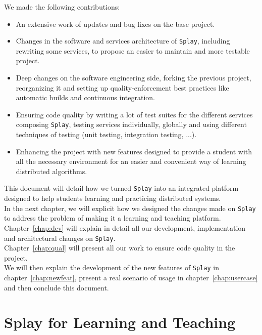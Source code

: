 \documentclass{eplmastersthesis}
\begin{document}
      We made the following contributions:

      \begin{itemize}
        \item An extensive work of updates and bug fixes on the base project.
        \item Changes in the software and services architecture of \texttt{Splay},
        including rewriting some services, to propose an easier to maintain and
        more testable project.
        \item Deep changes on the software engineering side, forking the
        previous project, reorganizing it and setting up quality-enforcement
        best practices like automatic builds and continuous integration.
        \item Ensuring code quality by writing a lot of test suites for the
        different services composing \texttt{Splay}, testing services individually,
        globally and using different techniques of testing (unit testing,
        integration testing, ...).
        \item Enhancing the project with new features designed to provide a
        student with all the necessary environment for an easier and convenient
        way of learning distributed algorithms.
      \end{itemize}

      This document will detail how we turned \texttt{Splay} into an integrated
      platform designed to help students learning and practicing distributed
      systems.\\
      In the next chapter, we will explicit how we designed the changes made on
      \texttt{Splay} to address the problem of making it a learning and teaching
      platform.\\
      Chapter~\ref{chap:dev} will explain in detail all our development,
      implementation and architectural changes on \texttt{Splay}.\\
      Chapter~\ref{chap:qual} will present all our work to ensure code quality
      in the project.\\
      We will then explain the development of the new features
      of \texttt{Splay} in chapter~\ref{chap:newfeat}, present a real scenario
      of usage in chapter~\ref{chap:usercase} and then conclude this document.

  \chapter{Splay for Learning and Teaching}
  \label{chap:splayteaching}
\end{document}
